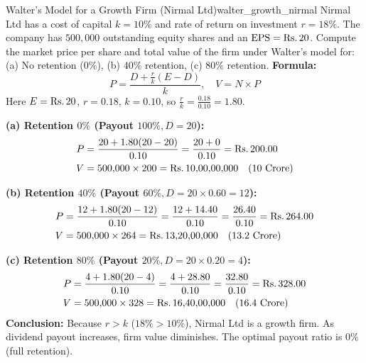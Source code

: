 \begin{example}{Walter's Model for a Growth Firm (Nirmal Ltd)}{walter_growth_nirmal}
Nirmal Ltd has a cost of capital $k = 10\%$ and rate of return on investment $r = 18\%$. The company has $500{,}000$ outstanding equity shares and an $\operatorname{EPS} = \text{Rs.}\, 20$. Compute the market price per share and total value of the firm under Walter's model for: (a) No retention ($0\%$), (b) $40\%$ retention, (c) $80\%$ retention.
\tcblower
\textbf{Formula:}
\begin{equation*}
    P = \frac{D + \frac{r}{k}(E - D)}{k}, \quad V = N \times P
\end{equation*}
Here $E = \text{Rs.}\, 20$, $r = 0.18$, $k = 0.10$, so $\frac{r}{k} = \frac{0.18}{0.10} = 1.80$.

\textbf{(a) Retention $0\%$ (Payout $100\%, D = 20$):}
\begin{align*}
    P &= \frac{20 + 1.80(20 - 20)}{0.10} = \frac{20 + 0}{0.10} = \text{Rs.}\, 200.00 \\
    V &= 500{,}000 \times 200 = \text{Rs.}\, 10{,}00{,}00{,}000 \quad (10\text{ Crore})
\end{align*}

\textbf{(b) Retention $40\%$ (Payout $60\%, D = 20 \times 0.60 = 12$):}
\begin{align*}
    P &= \frac{12 + 1.80(20 - 12)}{0.10} = \frac{12 + 14.40}{0.10} = \frac{26.40}{0.10} = \text{Rs.}\, 264.00 \\
    V &= 500{,}000 \times 264 = \text{Rs.}\, 13{,}20{,}00{,}000 \quad (13.2\text{ Crore})
\end{align*}

\textbf{(c) Retention $80\%$ (Payout $20\%, D = 20 \times 0.20 = 4$):}
\begin{align*}
    P &= \frac{4 + 1.80(20 - 4)}{0.10} = \frac{4 + 28.80}{0.10} = \frac{32.80}{0.10} = \text{Rs.}\, 328.00 \\
    V &= 500{,}000 \times 328 = \text{Rs.}\, 16{,}40{,}00{,}000 \quad (16.4\text{ Crore})
\end{align*}
\textbf{Conclusion:} Because $r > k$ ($18\% > 10\%$), Nirmal Ltd is a growth firm. As dividend payout increases, firm value diminishes. The optimal payout ratio is $0\%$ (full retention).
\end{example}

